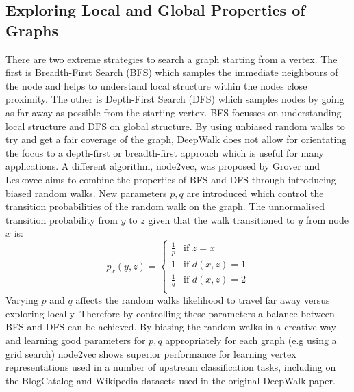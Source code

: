 \documentclass[a4paper]{article}
\begin{document}
\subsection{Exploring Local and Global Properties of Graphs}
There are two extreme strategies to search a graph starting from a vertex. The
first is Breadth-First Search (BFS) which samples the immediate neighbours of
the node and helps to understand local structure within the nodes close
proximity. The other is Depth-First Search (DFS) which samples nodes by going as
far away as possible from the starting vertex. BFS focusses on understanding
local structure and DFS on global structure. By using unbiased random walks to
try and get a fair coverage of the graph, DeepWalk does not allow for
orientating the focus to a depth-first or breadth-first approach which is useful
for many applications. A different algorithm, node2vec, was proposed by Grover
and Leskovec\cite{grover_leskovec2016} aims to combine the
properties of BFS and DFS through introducing biased random walks. New
parameters $p,q$ are introduced which control the transition probabilities of
the random walk on the graph. The unnormalised transition probability from $y$
to $z$ given that the walk transitioned to $y$ from node $x$ is:
\begin{equation}
  p_x(y,z)= 
  \begin{cases}
    \frac{1}{p}& \text{if } z = x\\
    1          & \text{if } d(x,z) = 1\\
    \frac{1}{q}& \text{if } d(x,z) = 2\\
  \end{cases}
\end{equation}
Varying $p$ and $q$ affects the random walks likelihood to travel far away
versus exploring locally. Therefore by controlling these parameters a balance
between BFS and DFS can be achieved. By biasing the random walks in a creative
way and learning good parameters for $p,q$ appropriately for each graph (e.g
using a grid search) node2vec shows superior performance for learning vertex
representations used in a number of upstream classification tasks, including on
the BlogCatalog and Wikipedia datasets used in the original DeepWalk paper.
\end{document}
